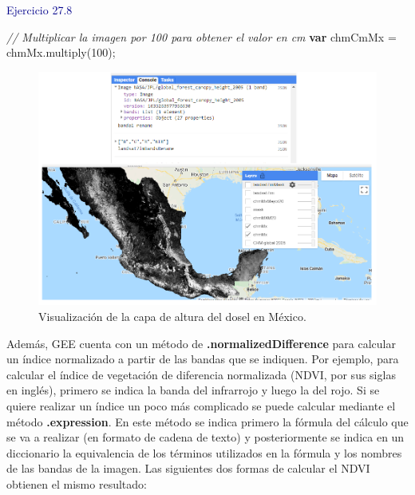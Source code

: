 \documentclass[
  12pt,
  letterpaper,
  twoside]{book}
\newenvironment{Shaded}{\begin{snugshade}}{\end{snugshade}}
\newcommand{\CommentTok}[1]{\textcolor[rgb]{0.24,0.58,0.00}{\textit{#1}}}
\newcommand{\ControlFlowTok}[1]{\textcolor[rgb]{0.00,0.00,0.00}{\textbf{#1}}}
\newcommand{\DecValTok}[1]{\textcolor[rgb]{0.28,0.53,0.93}{#1}}
\newcommand{\FunctionTok}[1]{\textcolor[rgb]{0.48,0.12,0.64}{#1}}
\newcommand{\NormalTok}[1]{#1}
\newcommand{\OperatorTok}[1]{\textcolor[rgb]{0.00,0.00,0.00}{#1}}
\newcommand\boldpurple[1]{\textcolor{darkpurple}{\textbf{#1}}}
\begin{document}
\textcolor{darkblue}{Ejercicio 27.8}

\begin{Shaded}
\begin{Highlighting}[]
\CommentTok{// Multiplicar la imagen por 100 para obtener el valor en cm}
\ControlFlowTok{var}\NormalTok{ chmCmMx }\OperatorTok{=}\NormalTok{ chmMx}\OperatorTok{.}\FunctionTok{multiply}\NormalTok{(}\DecValTok{100}\NormalTok{)}\OperatorTok{;}
\end{Highlighting}
\end{Shaded}

\begin{figure}[H]

{\centering \includegraphics[width=0.95\linewidth]{Img/ej276} 

}

\caption{Visualización de la capa de altura del dosel en México.}\label{fig:f96}
\end{figure}

Además, GEE cuenta con un método de \boldpurple{.normalizedDifference} para calcular un índice normalizado a partir de las bandas que se indiquen. Por ejemplo, para calcular el índice de vegetación de diferencia normalizada (NDVI, por sus siglas en inglés), primero se indica la banda del infrarrojo y luego la del rojo. Si se quiere realizar un índice un poco más complicado se puede calcular mediante el método \boldpurple{.expression}. En este método se indica primero la fórmula del cálculo que se va a realizar (en formato de cadena de texto) y posteriormente se indica en un diccionario la equivalencia de los términos utilizados en la fórmula y los nombres de las bandas de la imagen. Las siguientes dos formas de calcular el NDVI obtienen el mismo resultado:
\end{document}
